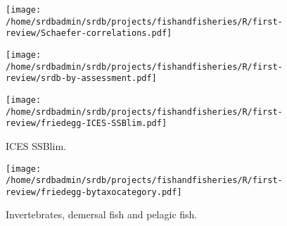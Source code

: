 \documentclass[letterpaper,review,authoryear,12pt]{article}
\begin{document}
\begin{figure}
\begin{center}
\texttt{[image: /home/srdbadmin/srdb/projects/fishandfisheries/R/first-review/Schaefer-correlations.pdf]}
\end{center}
\caption{ }\label{fig:corr}
\end{figure}


\begin{figure}
\begin{center}
\texttt{[image: /home/srdbadmin/srdb/projects/fishandfisheries/R/first-review/srdb-by-assessment.pdf]} %
\end{center}
\caption{ }\label{fig:taxo:srdb}
\end{figure}


\begin{figure}
\begin{center}
\texttt{[image: /home/srdbadmin/srdb/projects/fishandfisheries/R/first-review/friedegg-ICES-SSBlim.pdf]}
\end{center}
\caption{ ICES SSBlim.}
\label{fig:icesblim}
\end{figure}


\begin{figure}
\begin{center}
\texttt{[image: /home/srdbadmin/srdb/projects/fishandfisheries/R/first-review/friedegg-bytaxocategory.pdf]}
\end{center}
\caption{Invertebrates, demersal fish and pelagic fish.}
\label{fig:group}
\end{figure}
\end{document}

